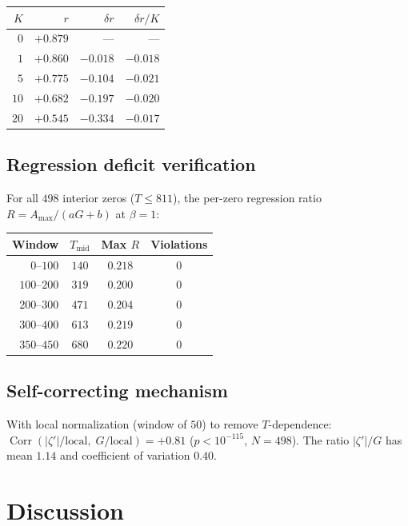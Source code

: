 \documentclass[11pt,a4paper]{article}
\DeclareMathOperator{\Corr}{Corr}
\begin{document}
\begin{center}
\begin{tabular}{rrrr}
\toprule
$K$ & $r$ & $\delta r$ & $\delta r / K$ \\
\midrule
$0$ & $+0.879$ & --- & --- \\
$1$ & $+0.860$ & $-0.018$ & $-0.018$ \\
$5$ & $+0.775$ & $-0.104$ & $-0.021$ \\
$10$ & $+0.682$ & $-0.197$ & $-0.020$ \\
$20$ & $+0.545$ & $-0.334$ & $-0.017$ \\
\bottomrule
\end{tabular}
\end{center}

\subsection{Regression deficit verification}
For all $498$ interior zeros ($T \leq 811$), the per-zero regression ratio $R = A_{\max}/(aG+b)$ at $\beta = 1$:

\begin{center}
\begin{tabular}{rccc}
\toprule
Window & $T_{\mathrm{mid}}$ & Max $R$ & Violations \\
\midrule
$0$--$100$ & $140$ & $0.218$ & $0$ \\
$100$--$200$ & $319$ & $0.200$ & $0$ \\
$200$--$300$ & $471$ & $0.204$ & $0$ \\
$300$--$400$ & $613$ & $0.219$ & $0$ \\
$350$--$450$ & $680$ & $0.220$ & $0$ \\
\bottomrule
\end{tabular}
\end{center}

\subsection{Self-correcting mechanism}
With local normalization (window of $50$) to remove $T$-dependence:
$\Corr(|\zeta'|/\mathrm{local},\; G/\mathrm{local}) = +0.81$ ($p < 10^{-115}$, $N = 498$).
The ratio $|\zeta'|/G$ has mean $1.14$ and coefficient of variation $0.40$.


\section{Discussion}
\end{document}
